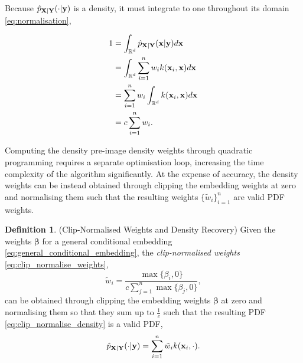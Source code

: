 \documentclass[twoside]{article} \usepackage{aistats2017}
\theoremstyle{definition}
\newtheorem{definition}{Definition}[section]
\theoremstyle{theorem}
\begin{document}
		Because $\hat{p}_{\mathbf{X} | \mathbf{Y}}(\cdot | \mathbf{y})$ is a density, it must integrate to one throughout its domain \eqref{eq:normalisation},
		
		\begin{equation}
			\begin{aligned}
				1 &= \int_{\mathbb{R}^{d}} \hat{p}_{\mathbf{X} | \mathbf{Y}}(\mathbf{x} | \mathbf{y}) d\mathbf{x} \\
				&= \int_{\mathbb{R}^{d}} \sum_{i = 1}^{n} w_{i} k(\mathbf{x}_{i}, \mathbf{x}) d\mathbf{x} \\
				&= \sum_{i = 1}^{n} w_{i} \int_{\mathbb{R}^{d}} k(\mathbf{x}_{i}, \mathbf{x}) d\mathbf{x} \\
				&= c \sum_{i = 1}^{n} w_{i}.
			\end{aligned}
		\label{eq:normalisation}
		\end{equation}

		Computing the density pre-image density weights through quadratic programming requires a separate optimisation loop, increasing the time complexity of the algorithm significantly. At the expense of accuracy, the density weights can be instead obtained through clipping the embedding weights at zero and normalising them such that the resulting weights $\{\tilde{w}_{i}\}_{i = 1}^{n}$ are valid PDF weights.

		\begin{definition} \label{def:clip_normalise}
			(Clip-Normalised Weights and Density Recovery)
			Given the weights $\bm{\beta}$ for a general conditional embedding \eqref{eq:general_conditional_embedding}, the \textit{clip-normalised weights} \eqref{eq:clip_normalise_weights},
			\begin{equation}
				\tilde{w}_{i} = \frac{\max\{\beta_{i}, 0\}}{c \sum_{j = 1}^{n} \max\{\beta_{j}, 0\}},
				\label{eq:clip_normalise_weights}
			\end{equation}
			can be obtained through clipping the embedding weights $\bm{\beta}$ at zero and normalising them so that they sum up to $\frac{1}{c}$ such that the resulting PDF \eqref{eq:clip_normalise_density} is a valid PDF,
			\begin{equation}
				\hat{p}_{\mathbf{X} | \mathbf{Y}}(\cdot | \mathbf{y}) = \sum_{i = 1}^{n} \tilde{w}_{i} k(\mathbf{x}_{i}, \cdot).
			\label{eq:clip_normalise_density}
			\end{equation}
		\end{definition}
			
\end{document}
